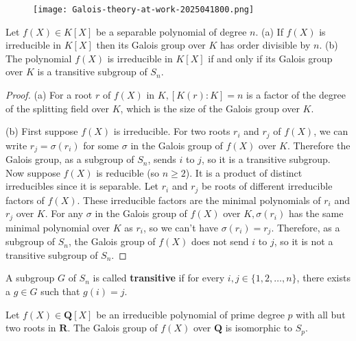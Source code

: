 \begin{figure}[H]
\centering
\texttt{[image: Galois-theory-at-work-2025041800.png]}
\label{}
\end{figure}


\begin{theorem}[Theorem 4.10]
Let $f(X) \in K[X]$ be a separable polynomial of degree $n$.
(a) If $f(X)$ is irreducible in $K[X]$ then its Galois group over $K$ has order divisible by $n$.
(b) The polynomial $f(X)$ is irreducible in $K[X]$ if and only if its Galois group over $K$ is a transitive subgroup of $S_n$.
\end{theorem}
\begin{proof}
(a) For a root $r$ of $f(X)$ in $K, [K(r): K]=n$ is a factor of the degree of the splitting field over $K$, which is the size of the Galois group over $K$.

(b) First suppose $f(X)$ is irreducible. For two roots $r_i$ and $r_j$ of $f(X)$, we can write $r_j=\sigma(r_i)$ for some $\sigma$ in the Galois group of $f(X)$ over $K$. Therefore the Galois group, as a subgroup of $S_n$, sends $i$ to $j$, so it is a transitive subgroup. Now suppose $f(X)$ is reducible (so $n \geq 2$). It is a product of distinct irreducibles since it is separable. Let $r_i$ and $r_j$ be roots of different irreducible factors of $f(X)$. These irreducible factors are the minimal polynomials of $r_i$ and $r_j$ over $K$. For any $\sigma$ in the Galois group of $f(X)$ over $K, \sigma(r_i)$ has the same minimal polynomial over $K$ as $r_i$, so we can't have $\sigma(r_i)=r_j$. Therefore, as a subgroup of $S_n$, the Galois group of $f(X)$ does not send $i$ to $j$, so it is not a transitive subgroup of $S_n$.
\end{proof}

\begin{definition}
A subgroup $G$ of $S_n$ is called \textbf{transitive} if for every $i, j \in\{1,2, \ldots, n\}$, there exists a $g \in G$ such that $g(i)=j$.
\end{definition}
\begin{theorem}
Let $f(X) \in \mathbf{Q}[X]$ be an irreducible polynomial of prime degree $p$ with all but two roots in $\mathbf{R}$. The Galois group of $f(X)$ over $\mathbf{Q}$ is isomorphic to $S_p$.\label{1bb574}
\end{theorem}


